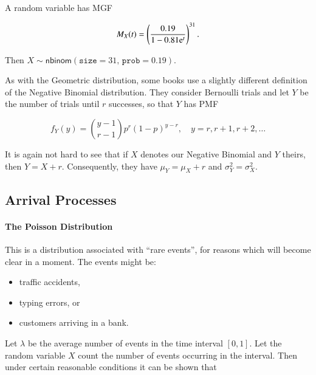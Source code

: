 \documentclass[captions=tableheading]{scrbook}
\begin{document}
\begin{example}
A random variable has MGF

\[
M_{X}(t)=\left(\frac{0.19}{1-0.81\mathrm{e}^{t}}\right)^{31}.
\]

Then \(X\sim\mathsf{nbinom}(\mathtt{size}=31,\,\mathtt{prob}=0.19)\).

\end{example}

\begin{note}
As with the Geometric distribution, some books use a slightly different definition of the Negative Binomial distribution. They consider Bernoulli trials and let \(Y\) be the number of trials until \(r\) successes, so that \(Y\) has PMF

\begin{equation}
f_{Y}(y)={y-1 \choose r-1}p^{r}(1-p)^{y-r},\quad y=r,r+1,r+2,\ldots
\end{equation}

It is again not hard to see that if \(X\) denotes our Negative Binomial and \(Y\) theirs, then \(Y=X+r\). Consequently, they have \(\mu_{Y}=\mu_{X}+r\) and \(\sigma_{Y}^{2}=\sigma_{X}^{2}\).

\end{note}
\subsection{Arrival Processes}
\label{sec-1-6-3}

\label{sec:Arrival-Processes}


\paragraph*{The Poisson Distribution}
\label{sub:The-Poisson-Distribution}

This is a distribution associated with ``rare events'', for reasons which will become clear in a moment. The events might be:
\begin{itemize}
\item traffic accidents,
\item typing errors, or
\item customers arriving in a bank.
\end{itemize}


Let \(\lambda\) be the average number of events in the time interval \([0,1]\). Let the random variable \(X\) count the number of events occurring in the interval. Then under certain reasonable conditions it can be shown that
\end{document}
